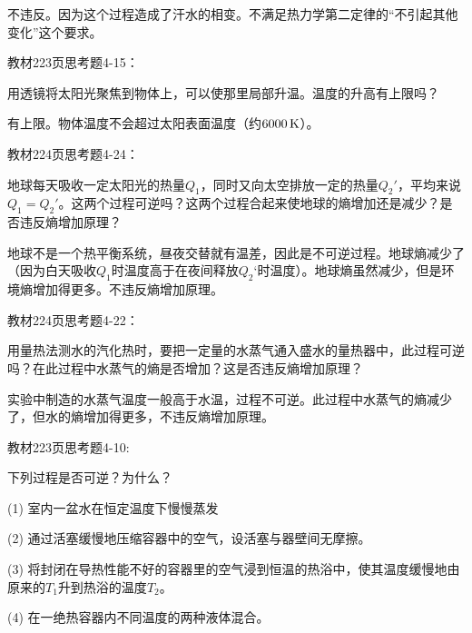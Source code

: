 \documentclass[CJK]{beamer}
\begin{document}
\begin{frame}
  \bch
  不违反。因为这个过程造成了汗水的相变。不满足热力学第二定律的“不引起其他变化”这个要求。
  \ech
\end{frame}


\begin{frame}
  \chtitle{\proid (\stwo)}
  \bch
  教材223页思考题4-15：

  用透镜将太阳光聚焦到物体上，可以使那里局部升温。温度的升高有上限吗？
  \ech
\end{frame}


\begin{frame}
  \bch
  有上限。物体温度不会超过太阳表面温度（约$6000\,\mathrm{K}$）。
  \ech
\end{frame}

\begin{frame}
  \chtitle{\proid (\sthree)}
  \bch
  教材224页思考题4-24：

  地球每天吸收一定太阳光的热量$Q_1$，同时又向太空排放一定的热量$Q_2'$，平均来说$Q_1 = Q_2'$。这两个过程可逆吗？这两个过程合起来使地球的熵增加还是减少？是否违反熵增加原理？
  \ech
\end{frame}


\begin{frame}
  \bch
  地球不是一个热平衡系统，昼夜交替就有温差，因此是不可逆过程。地球熵减少了（因为白天吸收$Q_1$时温度高于在夜间释放$Q_2‘$时温度）。地球熵虽然减少，但是环境熵增加得更多。不违反熵增加原理。
  \ech
\end{frame}

\begin{frame}
  \chtitle{\proid (\stwo)}
  \bch
  教材224页思考题4-22：

  用量热法测水的汽化热时，要把一定量的水蒸气通入盛水的量热器中，此过程可逆吗？在此过程中水蒸气的熵是否增加？这是否违反熵增加原理？
  \ech
\end{frame}


\begin{frame}
  \bch
  实验中制造的水蒸气温度一般高于水温，过程不可逆。此过程中水蒸气的熵减少了，但水的熵增加得更多，不违反熵增加原理。
  \ech
\end{frame}

\begin{frame}
  \chtitle{\proid (\stwo)}
  \bch
  教材223页思考题4-10:

  下列过程是否可逆？为什么？
  \bitem
\item[(1)]{室内一盆水在恒定温度下慢慢蒸发}
\item[(2)]{通过活塞缓慢地压缩容器中的空气，设活塞与器壁间无摩擦。}
\item[(3)]{将封闭在导热性能不好的容器里的空气浸到恒温的热浴中，使其温度缓慢地由原来的$T_1$升到热浴的温度$T_2$。}
\item[(4)]{在一绝热容器内不同温度的两种液体混合。}
  \eitem
  \ech
\end{frame}
\end{document}
